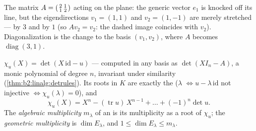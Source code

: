 \begin{omfigure}

{\small The matrix $A = \begin{psmallmatrix}2 & 1\\ 1 &
2\end{psmallmatrix}$ acting on the plane: the generic vector
$e_1$ is knocked off its line, but the eigendirections $v_1 =
(1,1)$ and $v_2 = (1,-1)$ are merely stretched --- by $3$ and by
$1$ (so $Av_2 = v_2$: the dashed image coincides with $v_2$).
Diagonalization is the change to the basis $(v_1, v_2)$, where
$A$ becomes $\operatorname{diag}(3, 1)$.}
\end{omfigure}

\begin{definition}\label{def:b2:reduction:charpoly}
$\chi_u(X) = \det(X\,\mathrm{id} - u)$ --- computed in any basis as $\det(XI_n - A)$, a monic
polynomial of degree $n$, invariant under similarity
(\cref{thm:b2:linalg:detrules}). Its roots in $K$ are exactly the
 ($\lambda$  $\iff u - \lambda\,\mathrm{id}$
not injective $\iff \chi_u(\lambda) = 0$), and
\[
\chi_u(X) = X^n - (\operatorname{tr} u)\, X^{n-1} + \dots +
(-1)^n \det u .
\]
The \emph{algebraic multiplicity}
$m_\lambda$ of an  is
its multiplicity as a root of $\chi_u$; the \emph{geometric
multiplicity} is $\dim E_\lambda$, and $1 \leq \dim E_\lambda \leq
m_\lambda$.
\end{definition}

